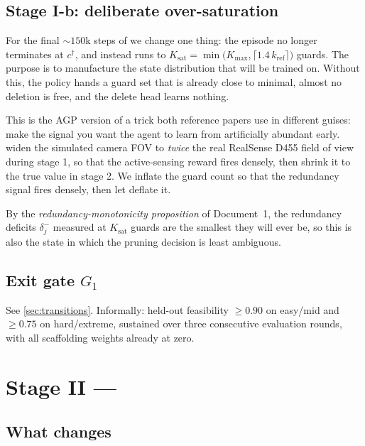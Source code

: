 \documentclass[11pt,a4paper]{article}
\begin{document}
\subsection{Stage I-b: deliberate over-saturation}\label{sec:overs}

For the final $\sim\!150$k steps of \stageI{} we change one thing: the episode no longer
terminates at $c^\dagger$, and instead runs to
$K_{\mathrm{sat}} = \min\bigl(K_{\max}, \lceil 1.4\, k_{\mathrm{ref}} \rceil\bigr)$ guards.
The purpose is to manufacture the state distribution that \stageII{} will be trained on.
Without this, the policy hands \stageII{} a guard set that is already close to minimal,
almost no deletion is free, and the delete head learns nothing.

This is the AGP version of a trick both reference papers use in different guises: make the
signal you want the agent to learn from artificially abundant early.
\citet{wang2025dribble} widen the simulated camera FOV to \emph{twice} the real
RealSense D455 field of view during stage 1, so that the active-sensing reward fires densely,
then shrink it to the true value in stage 2. We inflate the guard count so that the
redundancy signal fires densely, then let \stageII{} deflate it.

By the \emph{redundancy-monotonicity proposition} of Document~1, the redundancy deficits $\delta^-_j$ measured at
$K_{\mathrm{sat}}$ guards are the smallest they will ever be, so this is also the state in
which the pruning decision is least ambiguous.

\subsection{Exit gate $G_1$}

See \cref{sec:transitions}. Informally: held-out feasibility $\ge 0.90$ on easy/mid and
$\ge 0.75$ on hard/extreme, sustained over three consecutive evaluation rounds, with all
scaffolding weights already at zero.

\section{Stage II --- \stageII{}}

\subsection{What changes}
\end{document}
